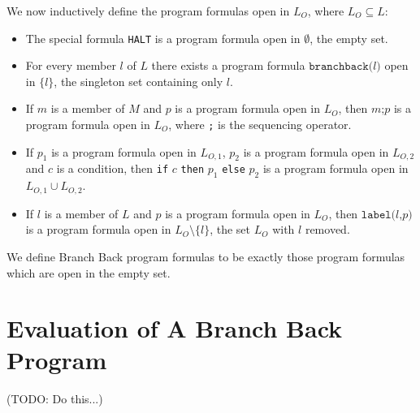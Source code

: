 \documentclass[11pt]{article}
\begin{document}
We now inductively define the program formulas open in $L_{O}$, where $L_{O} \subseteq L$:

\begin{itemize}
\item The special formula \texttt{HALT} is a program formula open in $\emptyset$, the empty set.
\item For every member $l$ of $L$ there exists a program formula $\texttt{branchback(}l\texttt{)}$ open in $\{l\}$, the singleton set containing only $l$.
\item If $m$ is a member of $M$ and $p$ is a program formula open in $L_{O}$, then $m\texttt{;}p$ is a program formula open in $L_{O}$, where \texttt{;} is the sequencing operator.
\item If $p_{1}$ is a program formula open in $L_{O,1}$, $p_{2}$ is a program formula open in $L_{O,2}$ and $c$ is a condition, then \texttt{if} $c$ \texttt{then} $p_{1}$ \texttt{else} $p_{2}$ is a program formula open in $L_{O,1} \cup L_{O,2}$.
\item If $l$ is a member of $L$ and $p$ is a program formula open in $L_{O}$, then $\texttt{label(}l\texttt{,} p\texttt{)}$ is a program formula open in $L_{O} \setminus \{l\}$, the set $L_{O}$ with $l$ removed.
\end{itemize}

We define Branch Back program formulas to be exactly those program formulas which are open in the empty set.

\section{Evaluation of A Branch Back Program}

(TODO: Do this...)
\end{document}

